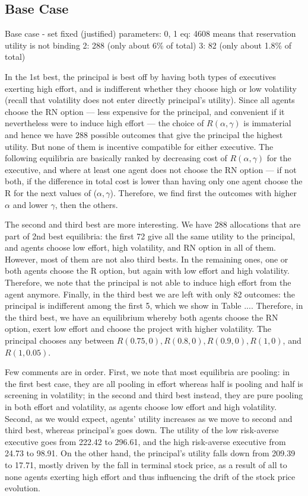 \subsection*{Base Case} 
Base case - set fixed (justified) parameters:
    0, 1 eq: 4608 
        means that reservation utility is not binding
    2: 288 (only about 6\% of total)
    3: 82 (only about 1.8\% of total)


In the 1st best, the principal is best off by having both types of executives exerting high effort, and is indifferent whether they choose high or low volatility (recall that volatility does not enter directly principal's utility). Since all agents choose the RN option --- less expensive for the principal, and convenient if it nevertheless were to induce high effort --- the choice of $R(\alpha, \gamma)$ is immaterial and hence we have 288 possible outcomes that give the principal the highest utility. But none of them is incentive compatible for either executive. The following equilibria are basically ranked by decreasing cost of $R(\alpha, \gamma)$ for the executive, and where at least one agent does not choose the RN option --- if not both, if the difference in total cost is lower than having only one agent choose the R for the next values of ($\alpha, \gamma$). Therefore, we find first the outcomes with higher $\alpha$ and lower $\gamma$, then the others. 


The second and third best are more interesting. We have 288 allocations that are part of 2nd best equilibria: the first 72 give all the same utility to the principal, and agents choose low effort, high volatility, and RN option in all of them. However, most of them are not also third bests. In the remaining ones, one or both agents choose the R option, but again with low effort and high volatility. Therefore, we note that the principal is not able to induce high effort from the agent anymore. Finally, in the third best we are left with only 82 outcomes: the principal is indifferent among the first 5, which we show in Table .... Therefore, in the third best, we have an equilibrium whereby both agents choose the RN option, exert low effort and choose the project with higher volatility. The principal chooses any between $R(0.75, 0), R(0.8, 0), R(0.9, 0), R(1, 0)$, and $R(1, 0.05)$. 



Few comments are in order. First, we note that most equilibria are pooling: in the first best case, they are all pooling in effort whereas half is pooling and half is screening in volatility; in the second and third best instead, they are pure pooling in both effort and volatility, as agents choose low effort and high volatility. Second, as we would expect, agents' utility increases as we move to second and third best, whereas principal's goes down. The utility of the low risk-averse executive goes from 222.42 to 296.61, and the high risk-averse executive from 24.73 to 98.91. On the other hand, the principal's utility falls down from 209.39 to 17.71, mostly driven by the fall in terminal stock price, as a result of all to none agents exerting high effort and thus influencing the drift of the stock price evolution.

